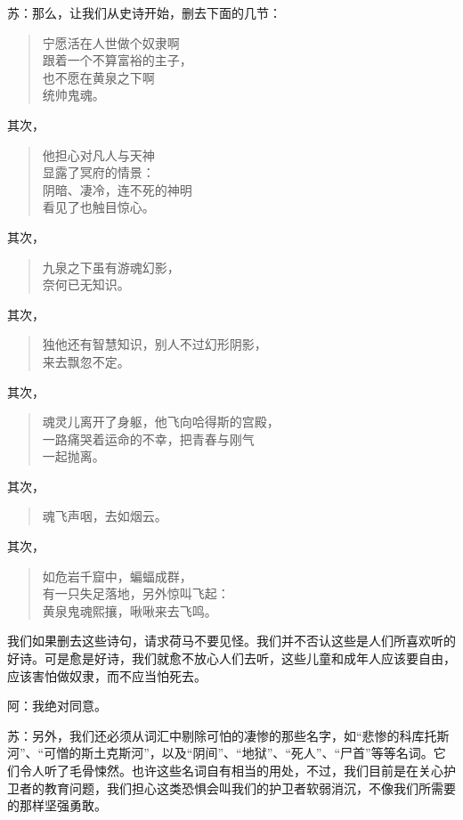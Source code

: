 \documentclass[11pt,oneside]{book}
\begin{document}
\begin{common-format}
苏：那么，让我们从史诗开始，删去下面的几节：
\begin{verse}
宁愿活在人世做个奴隶啊\\
跟着一个不算富裕的主子，\\
也不愿在黄泉之下啊\\
统帅鬼魂。
\end{verse}
其次，
\begin{verse}
他担心对凡人与天神\\
显露了冥府的情景：\\
阴暗、凄冷，连不死的神明\\
看见了也触目惊心。
\end{verse}
其次，
\begin{verse}
九泉之下虽有游魂幻影，\\
奈何已无知识。
\end{verse}
其次，
\begin{verse}
独他还有智慧知识，别人不过幻形阴影，\\
来去飘忽不定。
\end{verse}
其次，
\begin{verse}
魂灵儿离开了身躯，他飞向哈得斯的宫殿，\\
一路痛哭着运命的不幸，把青春与刚气\\
一起抛离。
\end{verse}
其次，
\begin{verse}
魂飞声咽，去如烟云。
\end{verse}
其次，
\begin{verse}
如危岩千窟中，蝙蝠成群，\\
有一只失足落地，另外惊叫飞起：\\
黄泉鬼魂熙攘，啾啾来去飞鸣。
\end{verse}
我们如果删去这些诗句，请求荷马不要见怪。我们并不否认这些是人们所喜欢听的好诗。可是愈是好诗，我们就愈不放心人们去听，这些儿童和成年人应该要自由，应该害怕做奴隶，而不应当怕死去。

阿：我绝对同意。

苏：另外，我们还必须从词汇中剔除可怕的凄惨的那些名字，如“悲惨的科库托斯河”、“可憎的斯土克斯河”，以及“阴间”、“地狱”、“死人”、“尸首”等等名词。它们令人听了毛骨悚然。也许这些名词自有相当的用处，不过，我们目前是在关心护卫者的教育问题，我们担心这类恐惧会叫我们的护卫者软弱消沉，不像我们所需要的那样坚强勇敢。


\end{common-format}
\end{document}
